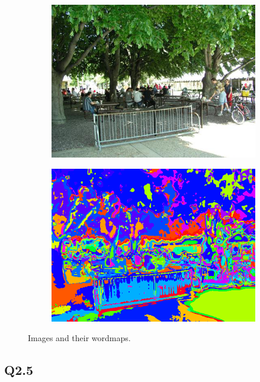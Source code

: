 \documentclass[11pt]{article}
\begin{document}
\begin{figure}[h!]
  \begin{subfigure}{0.4\linewidth}
    \centering
    \includegraphics[width=\textwidth]{../results/labelme_zbyarunxxqdfebc_image.png}
  \end{subfigure}
  \begin{subfigure}{0.4\linewidth}
    \centering
    \includegraphics[width=\textwidth]{../results/labelme_zbyarunxxqdfebc_wordmap.png}
  \end{subfigure}

  \caption{Images and their wordmaps. }
  \label{fig:q1.3}
\end{figure}

\newpage

\subsection*{Q2.5}
\end{document}
